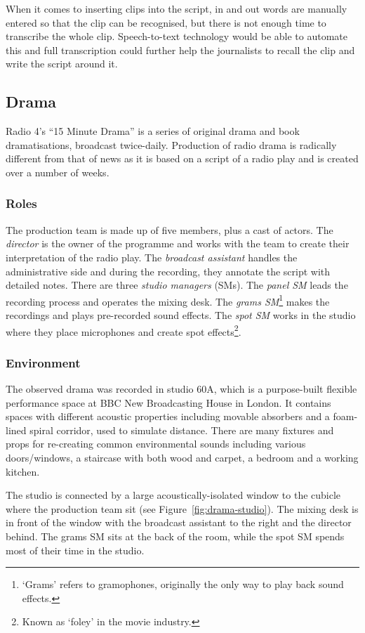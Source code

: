 When it comes to inserting clips into the script, in and out words are manually entered so that the clip can be
recognised, but there is not enough time to transcribe the whole clip. Speech-to-text technology would be able to
automate this and full transcription could further help the journalists to recall the clip and write the script around
it.

\subsection{Drama}\label{sec:drama}
Radio 4's ``15 Minute Drama'' is a series of original drama and book dramatisations, broadcast twice-daily. Production
of radio drama is radically different from that of news as it is based on a script of a radio play and is created over
a number of weeks.

\subsubsection{Roles}
The production team is made up of five members, plus a cast of actors. The \textit{director} is the owner of the
programme and works with the team to create their interpretation of the radio play. The \textit{broadcast assistant}
handles the administrative side and during the recording, they annotate the script with detailed notes. There are three
\textit{studio managers} (SMs). The \textit{panel SM} leads the recording process and operates the mixing desk.  The
\textit{grams SM}\footnote{`Grams' refers to gramophones, originally the only way to play back sound effects.} makes
the recordings and plays pre-recorded sound effects.  The \textit{spot SM} works in the studio where they place
microphones and create spot effects\footnote{Known as `foley' in the movie industry.}.

\subsubsection{Environment}
The observed drama was recorded in studio 60A, which is a purpose-built flexible performance space at BBC New
Broadcasting House in London. It contains spaces with different acoustic properties including movable absorbers and a
foam-lined spiral corridor, used to simulate distance. There are many fixtures and props for re-creating common
environmental sounds including various doors/windows, a staircase with both wood and carpet, a bedroom and a working
kitchen.

The studio is connected by a large acoustically-isolated window to the cubicle where the production team sit (see
Figure~\ref{fig:drama-studio}). The mixing desk is in front of the window with the broadcast assistant to the right and
the director behind. The grams SM sits at the back of the room, while the spot SM spends most of their time in the
studio.


